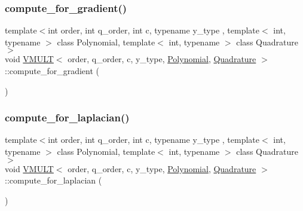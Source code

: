 \subsubsection{\texorpdfstring{compute\+\_\+for\+\_\+gradient()}{compute\_for\_gradient()}}
{\footnotesize\ttfamily template$<$int order, int q\+\_\+order, int c, typename y\+\_\+type , template$<$ int, typename $>$ class Polynomial, template$<$ int, typename $>$ class Quadrature$>$ \\
void \hyperlink{class_v_m_u_l_t}{V\+M\+U\+LT}$<$ order, q\+\_\+order, c, y\+\_\+type, \hyperlink{class_polynomial}{Polynomial}, \hyperlink{class_quadrature}{Quadrature} $>$\+::compute\+\_\+for\+\_\+gradient (\begin{DoxyParamCaption}{ }\end{DoxyParamCaption})\hspace{0.3cm}{\ttfamily [inline]}}

\mbox{\label{class_v_m_u_l_t_add49b6c92921149a92830f2930074aab}} 
\subsubsection{\texorpdfstring{compute\+\_\+for\+\_\+laplacian()}{compute\_for\_laplacian()}}
{\footnotesize\ttfamily template$<$int order, int q\+\_\+order, int c, typename y\+\_\+type , template$<$ int, typename $>$ class Polynomial, template$<$ int, typename $>$ class Quadrature$>$ \\
void \hyperlink{class_v_m_u_l_t}{V\+M\+U\+LT}$<$ order, q\+\_\+order, c, y\+\_\+type, \hyperlink{class_polynomial}{Polynomial}, \hyperlink{class_quadrature}{Quadrature} $>$\+::compute\+\_\+for\+\_\+laplacian (\begin{DoxyParamCaption}{ }\end{DoxyParamCaption})\hspace{0.3cm}{\ttfamily [inline]}}

\mbox{\label{class_v_m_u_l_t_a722ef0ecb53e27931993425f5514ea8a}} 
